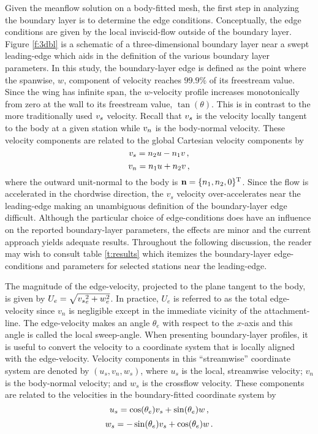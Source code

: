 Given the meanflow solution on a body-fitted mesh, the first step in analyzing
the boundary layer is to determine the edge conditions.  Conceptually, the
edge conditions are given by the local inviscid-flow outside of the boundary
layer.  Figure \ref{f:3dbl} is a schematic of a three-dimensional boundary
layer near a swept leading-edge which aids in the definition of the various
boundary layer parameters.  In this study, the boundary-layer edge is defined
as the point where the spanwise, $w$, component of velocity reaches $99.9\%$
of its freestream value.  Since the wing has infinite span, the $w$-velocity
profile increases monotonically from zero at the wall to its freestream value,
$\tan(\theta)$.  This is in contrast to the more traditionally used ${v_s}$
velocity.  Recall that ${v_s}$ is the velocity locally tangent to the body at a
given station while ${v_n}$ is the body-normal velocity.  These velocity
components are related to the global Cartesian velocity components by
%
\begin{equation}
  {v_s} = n_2 u - n_1 v {\, ,}
\end{equation}
%
\begin{equation}
  {v_n} = n_1 u + n_2 v {\, ,}
\end{equation}
%
where the outward unit-normal to the body is ${\bf n} = \{n_1,n_2,0\}^{\rm
T}$.  Since the flow is accelerated in the chordwise direction, the $v_s$
velocity over-accelerates near the leading-edge making an unambiguous
definition of the boundary-layer edge difficult.  Although the particular
choice of edge-conditions does have an influence on the reported
boundary-layer parameters, the effects are minor and the current approach
yields adequate results.  Throughout the following discussion, the reader may
wish to consult table \ref{t:results} which itemizes the boundary-layer
edge-conditions and parameters for selected stations near the leading-edge.

The magnitude of the edge-velocity, projected to the plane tangent to the
body, is given by $U_e = \sqrt{ {v_s}^2_e + w_e^2}$.  In practice, $U_e$ is
referred to as the total edge-velocity since $v_n$ is negligible except in the
immediate vicinity of the attachment-line.  The edge-velocity makes an angle
$\theta_e$ with respect to the $x$-axis and this angle is called the local
sweep-angle.  When presenting boundary-layer profiles, it is useful to convert
the velocity to a coordinate system that is locally aligned with the
edge-velocity. Velocity components in this ``streamwise'' coordinate system
are denoted by $(u_s,v_n,w_s)$, where $u_s$ is the local, streamwise velocity;
$v_n$ is the body-normal velocity; and $w_s$ is the crossflow velocity.  These
components are related to the velocities in the boundary-fitted coordinate
system by
%
\begin{equation}
  u_s = \cos(\theta_e) {v_s} + \sin(\theta_e) w {\, ,}
\end{equation}
%
\begin{equation}
  w_s = -\sin(\theta_e) {v_s} + \cos(\theta_e) w {\, .}
\end{equation}

